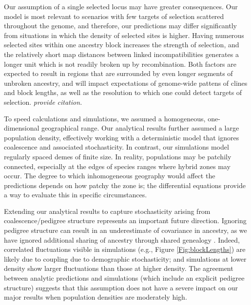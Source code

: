 \documentclass[11pt,letterpaper]{article}
\newcommand{\yb}[1]{{\em \color{magenta} #1}}
\begin{document}
Our assumption of a single selected locus may have greater consequences. Our model is most relevant to scenarios with few targets of selection scattered throughout the genome, and therefore, our predictions may differ significantly from situations in which the density of selected sites is higher. 
Having numerous selected sites within one ancestry block increases the strength of selection, and the relatively short map distances between linked incompatibilities generates a longer unit which is not readily broken up by recombination. Both factors are expected to result in regions that are surrounded by even longer segments of unbroken ancestry, and will impact expectations of genome-wide pattens of clines and block lengths, as well as the resolution to which one could detect targets of selection. 
\yb{provide citation.}
 

To speed calculations and simulations, we assumed a homogeneous, one-dimensional geographical range.
Our analytical results further assumed a large population density, 
effectively working with a deterministic model that ignores coalescence and associated stochasticity.
In contrast, our simulations model regularly spaced demes of finite size.
In reality, populations may be patchily connected, especially at the edges of species ranges where hybrid zones may occur. 
The degree to which inhomogeneous geography would affect the predictions depends on how patchy the zone is;
the differential equations provide a way to evaluate this in specific circumstances.

Extending our analytical results to capture stochasticity arising from coalescence/pedigree structure represents an important future direction.  
Ignoring pedigree structure can result in an underestimate of covariance in ancestry, as we have ignored additional sharing of ancestry through shared genealogy \citep{liang2014lengths}. 
Indeed, correlated fluctuations visible in simulations (e.g., Figure \ref{Fig:blockLengths})
are likely due to coupling due to demographic stochasticity;
and simulations at lower density show larger fluctuations than those at higher density.
The agreement between analytic predictions and simulations (which include an explicit pedigree structure)
suggests that this assumption does not have a severe impact on our major results when population densities are moderately high.
\end{document}
